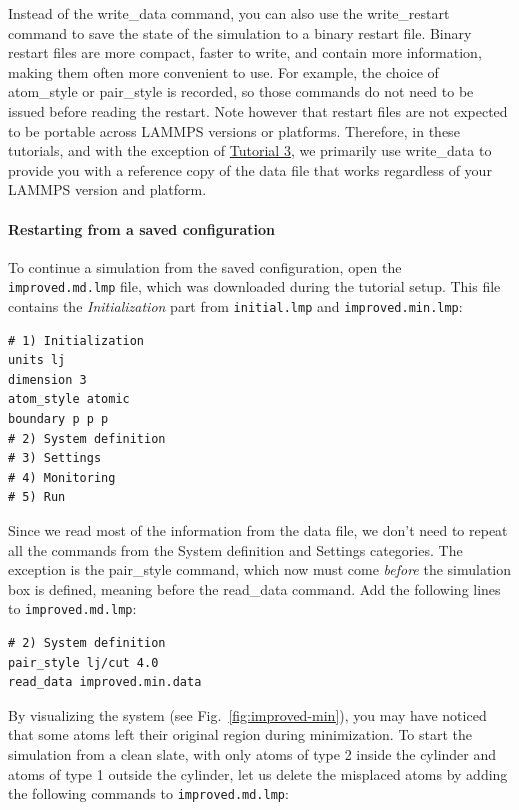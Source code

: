 \documentclass[9pt,tutorial]{livecoms}
\newcommand{\lmpcmd}[1]{\hspace{0pt}\colorbox{listing}{\textcolor{command}{\small{#1}}}\hspace{0pt}} %
\newcommand{\lmpcmdnote}[1]{\hspace{0pt}\colorbox{note_listing}{\textcolor{command}{\small{#1}}}\hspace{0pt}} %
\newcommand{\flecmd}[1]{\textcolor{command}{\texttt{#1}}} %
\begin{document}
\begin{note}
Instead of the \lmpcmdnote{write\_data} command, you can also use the
\lmpcmdnote{write\_restart} command to save the state
of the simulation to a binary restart file.  Binary restart files are
more compact, faster to write, and contain more information, making them often
more convenient to use.  For example, the choice of \lmpcmdnote{atom\_style}
or \lmpcmdnote{pair\_style} is recorded, so those commands do not need to be issued
before reading the restart.  Note however that restart files are not expected to be
portable across LAMMPS versions or platforms.  Therefore, in these tutorials,
and with the exception of \hyperref[all-atom-label]{Tutorial 3}, we primarily use \lmpcmdnote{write\_data} to provide you with a reference
copy of the data file that works regardless of your LAMMPS version and platform.
\end{note}

\paragraph{Restarting from a saved configuration}

To continue a simulation from the saved configuration, open the
\flecmd{improved.md.lmp} file, which was downloaded during the tutorial setup.
This file contains the \textit{Initialization} part from \flecmd{initial.lmp}
and \flecmd{improved.min.lmp}:
\begin{lstlisting}
# 1) Initialization
units lj
dimension 3
atom_style atomic
boundary p p p
# 2) System definition
# 3) Settings
# 4) Monitoring
# 5) Run
\end{lstlisting}
Since we read most of the information from the data file, we don't need
to repeat all the commands from the \lmpcmd{System definition}
and \lmpcmd{Settings} categories.  The exception is the \lmpcmd{pair\_style}
command, which now must come \emph{before} the simulation box is defined,
meaning before the \lmpcmd{read\_data} command.  Add the following
lines to \flecmd{improved.md.lmp}:
\begin{lstlisting}
# 2) System definition
pair_style lj/cut 4.0
read_data improved.min.data
\end{lstlisting}

By visualizing the system (see Fig.~\ref{fig:improved-min}), you may
have noticed that some atoms left their original region during
minimization.  To start the simulation from a clean slate, with only
atoms of type 2 inside the cylinder and atoms of type 1 outside the
cylinder, let us delete the misplaced atoms by adding the following
commands to \flecmd{improved.md.lmp}:
\end{document}
